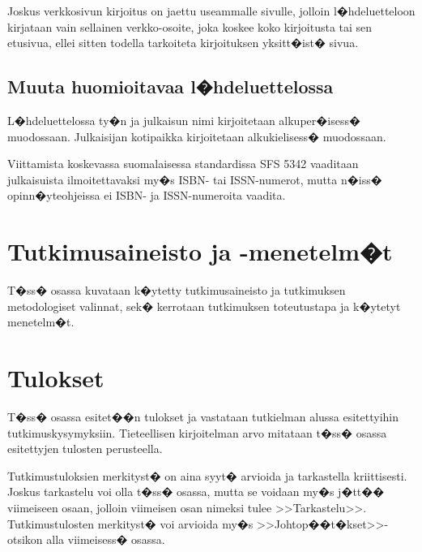 \documentclass[finnish,12pt,a4paper,pdftex]{article}
\begin{document}
Joskus verkkosivun kirjoitus on jaettu useammalle sivulle, jolloin
l�hdeluetteloon kirjataan vain sellainen verkko-osoite, joka koskee
koko kirjoitusta tai sen etusivua, ellei sitten 
todella tarkoiteta kirjoituksen yksitt�ist� sivua. 

\subsection*{Muuta huomioitavaa l�hdeluettelossa}

L�hdeluettelossa ty�n ja julkaisun nimi kirjoitetaan alkuper�isess�
muodossaan. Julkaisijan kotipaikka kirjoitetaan alkukielisess�
muodossaan.

Viittamista koskevassa suomalaisessa standardissa
SFS 5342 \cite{sfs} vaaditaan julkaisuista ilmoitettavaksi my�s ISBN- tai
ISSN-numerot, mutta n�iss� opinn�yteohjeissa ei ISBN- ja 
ISSN-numeroita vaadita. 

\clearpage

\section{Tutkimusaineisto ja -menetelm�t}

T�ss� osassa kuvataan k�ytetty tutkimusaineisto ja
tutkimuksen metodologiset valinnat, sek�
kerrotaan tutkimuksen toteutustapa ja k�ytetyt menetelm�t. 

\clearpage

\section{Tulokset}

T�ss� osassa esitet��n tulokset ja vastataan tutkielman alussa
esitettyihin tutkimuskysymyksiin. Tieteellisen kirjoitelman
arvo mitataan t�ss� osassa esitettyjen tulosten perusteella. 

Tutkimustuloksien merkityst� on aina syyt� arvioida ja tarkastella
kriittisesti.  Joskus tarkastelu voi olla t�ss� osassa, mutta se
voidaan my�s j�tt�� viimeiseen osaan, jolloin viimeisen osan nimeksi
tulee >>Tarkastelu>>. Tutkimustulosten merkityst� voi arvioida my�s
>>Johtop��t�kset>>-otsikon alla viimeisess� osassa. 
\end{document}
